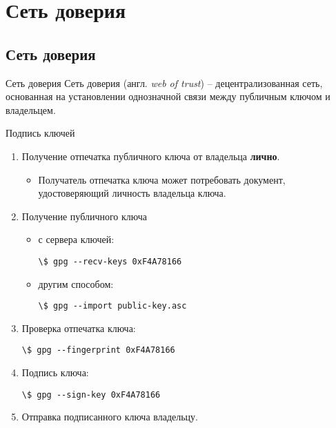 \documentclass[presentation]{beamer}
\begin{document}


\section{Сеть доверия}

\subsection{Сеть доверия}

\begin{frame}{Сеть доверия}
  \raisebox{-.30em}{\Large\HandRight}\hspace{.25em} Сеть доверия
  (англ. \emph{web of trust}) -- децентрализованная сеть, основанная
  на установлении однозначной связи между публичным ключом и
  владельцем.
\end{frame}

\begin{frame}[fragile]{Подпись ключей}
  \begin{enumerate}
  \item Получение отпечатка публичного ключа от владельца
    \textbf{лично}.
    \begin{itemize}
    \item Получатель отпечатка ключа может потребовать документ,
      удостоверяющий личность владельца ключа.
    \end{itemize}
  \item Получение публичного ключа
    \begin{itemize}
    \item с сервера ключей:
    \begin{Verbatim}[commandchars=\\\[\]]
      \$ gpg --recv-keys 0xF4A78166
    \end{Verbatim}
    \item другим способом:
    \begin{Verbatim}[commandchars=\\\[\]]
      \$ gpg --import public-key.asc
    \end{Verbatim}
    \end{itemize}
  \item Проверка отпечатка ключа:
    \begin{Verbatim}[commandchars=\\\[\]]
      \$ gpg --fingerprint 0xF4A78166
    \end{Verbatim}
  \item Подпись ключа:
    \begin{Verbatim}[commandchars=\\\[\]]
      \$ gpg --sign-key 0xF4A78166
    \end{Verbatim}
  \item Отправка подписанного ключа владельцу.
  \end{enumerate}
\end{frame}
\end{document}
